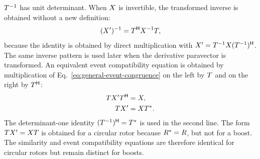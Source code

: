 \(T^{-1}\) has unit determinant. When \(X\) is invertible, the
transformed inverse is obtained without a new definition:
\begin{equation}
(X')^{-1}=T^{\mathsf H}X^{-1}T,
\label{eq:event-inverse-transform}
\end{equation}
because the identity is obtained by direct multiplication with
\(X'=T^{-1}X(T^{-1})^{\mathsf H}\). The same inverse
pattern is used later when the derivative paravector is transformed. An
equivalent event compatibility equation is obtained by
multiplication of Eq.\ \eqref{eq:general-event-congruence} on the left by
\(T\) and on the right by \(T^{\mathsf H}\):
\begin{align}
TX'T^{\mathsf H}&=X,\notag\\
TX'&=XT^*.
\label{eq:event-intertwining}
\end{align}
The determinant-one identity
\((T^{-1})^{\mathsf H}=T^*\) is used in the second line.
The form \(TX'=XT\) is obtained for a circular rotor because
\(R^*=R\), but not for a boost. The similarity and event
compatibility equations are therefore identical for circular rotors but
remain distinct for boosts.

